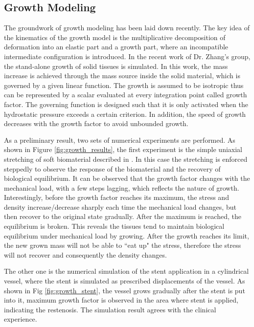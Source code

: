 \documentclass[12pt]{article}
\begin{document}
\subsection{Growth Modeling}
The groundwork of growth modeling has been laid down recently. The key idea of the kinematics of the growth model is the multiplicative decomposition of deformation into an elastic part and a growth part, where an incompatible intermediate configuration is introduced. In the recent work of Dr. Zhang's group, the stand-alone growth of solid tissues is simulated. In this work, the mass increase is achieved through the mass source inside the solid material, which is governed by a given linear function. The growth is assumed to be isotropic thus can be represented by a scalar evaluated at every integration point called growth factor. The governing function is designed such that it is only activated when the hydrostatic pressure exceeds a certain criterion. In addition, the speed of growth decreases with the growth factor to avoid unbounded growth.

As a preliminary result, two sets of numerical experiments are performed. As shown in Figure \ref{fig:growth_results}, the first experiment is the simple uniaxial stretching of soft biomaterial described in \cite{Himpel}. In this case the stretching is enforced steppedly to observe the response of the biomaterial and the recovery of biological equilibrium. It can be observed that the growth factor changes with the mechanical load, with a few steps lagging, which reflects the nature of growth. Interestingly, before the growth factor reaches its maximum, the stress and density increase/decrease sharply each time the mechanical load changes, but then recover to the original state gradually. After the maximum is reached, the equilibrium is broken. This reveals the tissues tend to maintain biological equilibrium under mechanical load by growing. After the growth reaches its limit, the new grown mass will not be able to ``eat up" the stress, therefore the stress will not recover and consequently the density changes.

The other one is the numerical simulation of the stent application in a cylindrical vessel, where the stent is simulated as prescribed displacements of the vessel. As shown in Fig \ref{fig:growth_stent}, the vessel grows gradually after the stent is put into it, maximum growth factor is observed in the area where stent is applied, indicating the restenosis. The simulation result agrees with the clinical experience.
\end{document}
